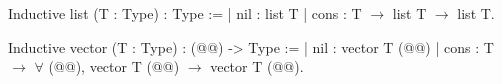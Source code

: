 Inductive list (T : Type) : Type :=
| nil : list T
| cons :
    T $\rightarrow$ list T $\rightarrow$ list T.

Inductive vector (T : Type) : (@@) -> Type :=
| nil : vector T (@@)
| cons :
    T $\rightarrow$ $\forall$ (@@), vector T (@@) $\rightarrow$ vector T (@@).
